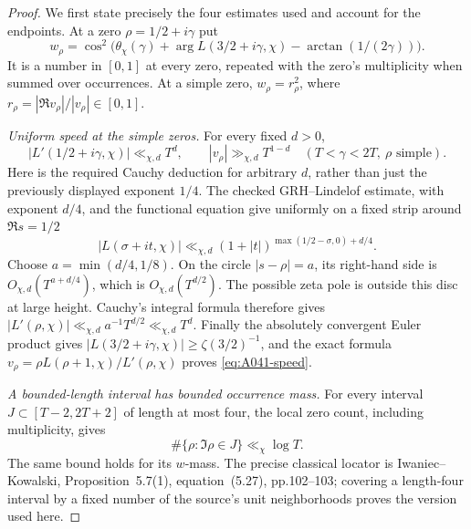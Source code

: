 \begin{proof}
We first state precisely the four estimates used and account for
the endpoints. At a zero $\rho=1/2+i\gamma$ put
\[
 w_\rho=\cos^2\bigl(\theta_\chi(\gamma)
       +\arg L(3/2+i\gamma,\chi)-\arctan(1/(2\gamma))\bigr).
\]
It is a number in $[0,1]$ at every zero, repeated with the zero's
multiplicity when summed over occurrences. At a simple zero,
$w_\rho=r_\rho^2$, where
$r_\rho=|\Re v_\rho|/|v_\rho|\in[0,1]$.

\emph{Uniform speed at the simple zeros.}
For every fixed $d>0$,
\begin{equation}\label{eq:A041-speed}
 |L'(1/2+i\gamma,\chi)|\ll_{\chi,d}T^d,
 \qquad |v_\rho|\gg_{\chi,d}T^{1-d}
              \quad(T<\gamma<2T,\ \rho\text{ simple}).
\end{equation}
Here is the required Cauchy deduction for arbitrary $d$, rather
than just the previously displayed exponent $1/4$. The checked
GRH--Lindelof estimate, with exponent $d/4$, and the functional
equation give uniformly on a fixed strip around $\Re s=1/2$
\[
 |L(\sigma+it,\chi)|\ll_{\chi,d}
          (1+|t|)^{\max(1/2-\sigma,0)+d/4}.
\]
Choose $a=\min(d/4,1/8)$. On the circle $|s-\rho|=a$,
its right-hand side is $O_{\chi,d}(T^{a+d/4})$, which is
$O_{\chi,d}(T^{d/2})$. The possible zeta pole is outside this
disc at large height. Cauchy's integral formula therefore gives
$|L'(\rho,\chi)|\ll_{\chi,d}a^{-1}T^{d/2}
\ll_{\chi,d}T^d$. Finally the absolutely convergent Euler
product gives
$|L(3/2+i\gamma,\chi)|\ge\zeta(3/2)^{-1}$, and the exact
formula $v_\rho=\rho L(\rho+1,\chi)/L'(\rho,\chi)$ proves
\eqref{eq:A041-speed}.

\emph{A bounded-length interval has bounded occurrence mass.}
For every interval $J\subset[T-2,2T+2]$ of length at most four,
the local zero count, including multiplicity, gives
\begin{equation}\label{eq:A041-local-count}
 \#\{\rho:\Im\rho\in J\}\ll_\chi\log T.
\end{equation}
The same bound holds for its $w$-mass. The precise classical
locator is Iwaniec--Kowalski, Proposition~5.7(1), equation~(5.27),
pp.102--103; covering a length-four interval by a fixed number of
the source's unit neighborhoods proves the version used here.


\end{proof}
